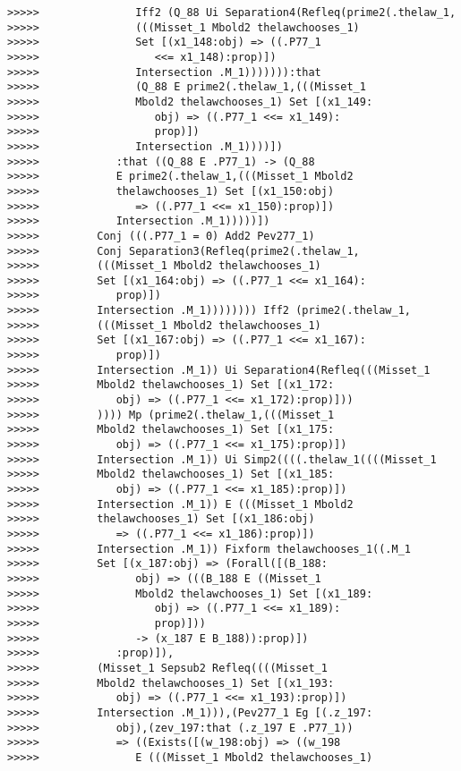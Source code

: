 \documentclass[12pt]{article}
\begin{document}
\begin{verbatim}
>>>>>               Iff2 (Q_88 Ui Separation4(Refleq(prime2(.thelaw_1,
>>>>>               (((Misset_1 Mbold2 thelawchooses_1)
>>>>>               Set [(x1_148:obj) => ((.P77_1
>>>>>                  <<= x1_148):prop)])
>>>>>               Intersection .M_1))))))):that
>>>>>               (Q_88 E prime2(.thelaw_1,(((Misset_1
>>>>>               Mbold2 thelawchooses_1) Set [(x1_149:
>>>>>                  obj) => ((.P77_1 <<= x1_149):
>>>>>                  prop)])
>>>>>               Intersection .M_1))))])
>>>>>            :that ((Q_88 E .P77_1) -> (Q_88
>>>>>            E prime2(.thelaw_1,(((Misset_1 Mbold2
>>>>>            thelawchooses_1) Set [(x1_150:obj)
>>>>>               => ((.P77_1 <<= x1_150):prop)])
>>>>>            Intersection .M_1)))))])
>>>>>         Conj (((.P77_1 = 0) Add2 Pev277_1)
>>>>>         Conj Separation3(Refleq(prime2(.thelaw_1,
>>>>>         (((Misset_1 Mbold2 thelawchooses_1)
>>>>>         Set [(x1_164:obj) => ((.P77_1 <<= x1_164):
>>>>>            prop)])
>>>>>         Intersection .M_1)))))))) Iff2 (prime2(.thelaw_1,
>>>>>         (((Misset_1 Mbold2 thelawchooses_1)
>>>>>         Set [(x1_167:obj) => ((.P77_1 <<= x1_167):
>>>>>            prop)])
>>>>>         Intersection .M_1)) Ui Separation4(Refleq(((Misset_1
>>>>>         Mbold2 thelawchooses_1) Set [(x1_172:
>>>>>            obj) => ((.P77_1 <<= x1_172):prop)]))
>>>>>         )))) Mp (prime2(.thelaw_1,(((Misset_1
>>>>>         Mbold2 thelawchooses_1) Set [(x1_175:
>>>>>            obj) => ((.P77_1 <<= x1_175):prop)])
>>>>>         Intersection .M_1)) Ui Simp2((((.thelaw_1((((Misset_1
>>>>>         Mbold2 thelawchooses_1) Set [(x1_185:
>>>>>            obj) => ((.P77_1 <<= x1_185):prop)])
>>>>>         Intersection .M_1)) E (((Misset_1 Mbold2
>>>>>         thelawchooses_1) Set [(x1_186:obj)
>>>>>            => ((.P77_1 <<= x1_186):prop)])
>>>>>         Intersection .M_1)) Fixform thelawchooses_1((.M_1
>>>>>         Set [(x_187:obj) => (Forall([(B_188:
>>>>>               obj) => (((B_188 E ((Misset_1
>>>>>               Mbold2 thelawchooses_1) Set [(x1_189:
>>>>>                  obj) => ((.P77_1 <<= x1_189):
>>>>>                  prop)]))
>>>>>               -> (x_187 E B_188)):prop)])
>>>>>            :prop)]),
>>>>>         (Misset_1 Sepsub2 Refleq((((Misset_1
>>>>>         Mbold2 thelawchooses_1) Set [(x1_193:
>>>>>            obj) => ((.P77_1 <<= x1_193):prop)])
>>>>>         Intersection .M_1))),(Pev277_1 Eg [(.z_197:
>>>>>            obj),(zev_197:that (.z_197 E .P77_1))
>>>>>            => ((Exists([(w_198:obj) => ((w_198
>>>>>               E (((Misset_1 Mbold2 thelawchooses_1)

\end{verbatim}
\end{document}
